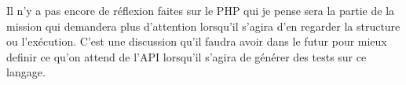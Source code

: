Il n'y a pas encore de réflexion faites sur le PHP qui je pense sera la partie de la mission qui demandera plus d'attention lorsqu'il s'agira d'en regarder la structure ou l'exécution. C'est une discussion qu'il faudra avoir dans le futur pour mieux definir ce qu'on attend de l'API lorsqu'il s'agira de générer des tests sur ce langage.\\